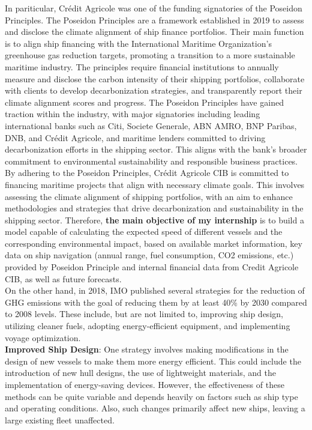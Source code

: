 \documentclass[a4paper,12pt]{article}
\begin{document}
In pariticular, Crédit Agricole was one of the funding signatories of the Poseidon Principles.
The Poseidon Principles are a framework established in 2019 to assess and disclose the climate alignment of ship finance portfolios.
Their main function is to align ship financing with the International Maritime Organization's greenhouse gas reduction targets, promoting a transition to a more sustainable maritime industry.
The principles require financial institutions to annually measure and disclose the carbon intensity of their shipping portfolios, collaborate with clients to develop decarbonization strategies, and transparently report their climate alignment scores and progress.
The Poseidon Principles have gained traction within the industry, with major signatories including leading international banks such as Citi, Societe Generale, ABN AMRO, BNP Paribas, DNB, and Crédit Agricole, and maritime lenders committed to driving decarbonization efforts in the shipping sector.
This aligns with the bank's broader commitment to environmental sustainability and responsible business practices. By adhering to the Poseidon Principles, Crédit Agricole CIB is committed to financing maritime projects that align with necessary climate goals.
This involves assessing the climate alignment of shipping portfolios, with an aim to enhance methodologies and strategies that drive decarbonization and sustainability in the shipping sector.
Therefore, \textbf{the main objective of my internship} is to build a model capable of calculating the expected speed of different vessels and the corresponding environmental impact, based on available market information, key data on ship navigation (annual range, fuel consumption, CO2 emissions, etc.) provided by Poseidon Principle and internal financial data from Credit Agricole CIB, as well as future forecasts.\\

On the other hand, in 2018, IMO published several strategies for the reduction of GHG emissions with the goal of reducing them by at least 40\% by 2030 compared to 2008 levels.
These include, but are not limited to, improving ship design, utilizing cleaner fuels, adopting energy-efficient equipment, and implementing voyage optimization.\\

\textbf{Improved Ship Design}: One strategy involves making modifications in the design of new vessels to make them more energy efficient.
This could include the introduction of new hull designs, the use of lightweight materials, and the implementation of energy-saving devices.
However, the effectiveness of these methods can be quite variable and depends heavily on factors such as ship type and operating conditions.
Also, such changes primarily affect new ships, leaving a large existing fleet unaffected.\\
\end{document}
